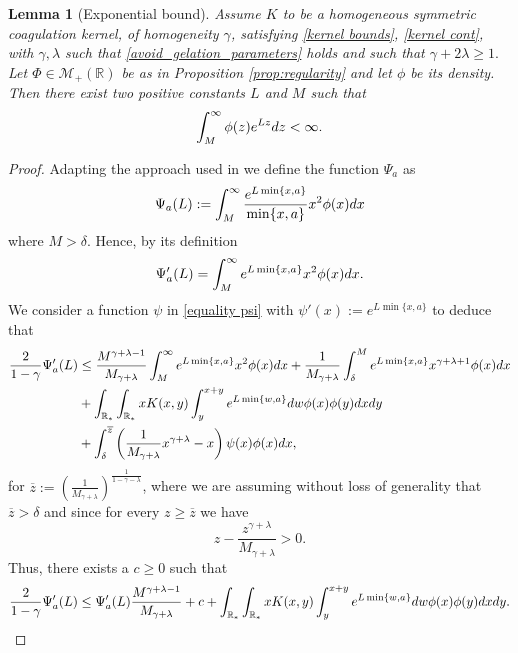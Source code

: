 \documentclass[11pt]{article}
\numberwithin{equation}{section}
\theoremstyle{plain}
\newtheorem{lemma}[theorem]{Lemma}
\newcommand{\der}{\textup{d}}
\begin{document}
\begin{lemma}[Exponential bound] \label{lemma:expo bound}
Assume $K$ to be a homogeneous symmetric coagulation kernel, of homogeneity $\gamma$, satisfying
\eqref{kernel bounds},  \eqref{kernel cont},  with $\gamma , \lambda $ such that  \eqref{avoid_gelation_parameters} holds and such that
$ \gamma+2\lambda \geq  1.$
		Let $\Phi \in \mathcal M_+(\mathbb R) $ be as in Proposition \ref{prop:regularity}  and let $\phi$ be its density. 
	Then there exist two positive constants $L$ and $M$ such that 
	\begin{equation}\label{expo bound}
	\int_{M}^\infty \phi(z) e^{L z } \der z < \infty. 	
	\end{equation}
	\end{lemma} 
\begin{proof}



Adapting the approach used in \cite{fournier2006local} we define the function $\Psi_a $ as 
\[
\Psi_a(L):= \int_M^\infty
 \frac{e^{L \min\{ x, a \}}}{\min\{ x, a \}}   x^2 \phi(x) \der x  
\]
where $M > \delta$. 
Hence, by its definition
\[
\Psi_a'(L)=  \int_M^\infty
e^{L \min\{ x, a \}}x^2 \phi(x) \der x .
\]
We consider a function $\psi$ in \eqref{equality psi} with
$\psi'(x):=
  e^{L \min\{ x, a \}} $
 to deduce that
\begin{align*}
 \frac{2}{1-\gamma } \Psi_a' (L) & \leq \frac{M^{\gamma+\lambda-1}}{M_{\gamma+\lambda}} \int_M^\infty e^{L \min\{ x,a \}} x^{2} \phi(x) \der x +\frac{1} {M_{\gamma+\lambda}} \int_\delta^M  e^{L \min\{ x,a \}} x^{\gamma + \lambda +1 } \phi(x) \der x 
\\
&+\int_{\mathbb R_*}  \int_{\mathbb R_*} x K(x,y) \int_{y}^{x+y}   e^{L \min\{ w, a \}} \der w \phi(x) \phi(y) \der x \der y \\
&+ 
\int_\delta^{\overline z } \left(\frac{1}{M_{\gamma+\lambda}} x^{\gamma + \lambda } -x \right) \psi(x) \phi(x) \der x, 
\end{align*}
for $
\overline z := \left( \frac{1}{ M_{\gamma+\lambda}}\right)^{\frac{1}{1-\gamma - \lambda}}$, where we are assuming without loss of generality that $\overline z> \delta$ and since for every  $z \geq \overline z$ we have
\begin{equation} \label{positivity} 
z- \frac{z^{\gamma + \lambda}}{M_{\gamma + \lambda }} > 0.
\end{equation}
Thus, there exists a $c \geq 0$ such that
\begin{align*}
 \frac{2}{1-\gamma } \Psi_a' (L) \leq  \Psi_a' (L)  \frac{M^{\gamma+\lambda-1}}{M_{\gamma+\lambda}}+ c 
+\int_{\mathbb R_*}  \int_{\mathbb R_*} x K(x,y) \int_{y}^{x+y}   e^{L \min\{ w, a \}} \der w \phi(x) \phi(y) \der x \der y . 
\end{align*}


\end{proof}
\end{document}
